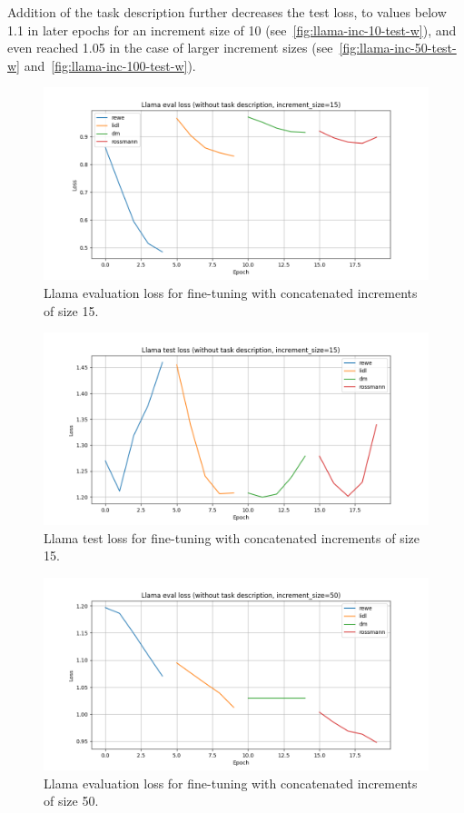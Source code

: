 \documentclass[licencjacka,en]{pracamgr}
\begin{document}
Addition of the task description further decreases the test loss, to values below 1.1 in later epochs for an increment size of 10 (see~\ref{fig:llama-inc-10-test-w}), and even reached 1.05 in the case of larger increment sizes (see~\ref{fig:llama-inc-50-test-w} and~\ref{fig:llama-inc-100-test-w}).

\begin{figure}[htbp]
    \centering
    \includegraphics[width=0.8\linewidth]{bachelor_images/llama_ft/llama-inc-15-tot-eval.png}
    \caption{Llama evaluation loss for fine-tuning with concatenated increments of size 15.}
    \label{fig:llama-inc-tot-15-eval}
\end{figure}

\begin{figure}[htbp]
    \centering
    \includegraphics[width=0.8\linewidth]{bachelor_images/llama_ft/llama-inc-15-tot-test.png}
    \caption{Llama test loss for fine-tuning with concatenated increments of size 15.}
    \label{fig:llama-inc-tot-15-test}
\end{figure}

\begin{figure}[htbp]
    \centering
    \includegraphics[width=0.8\linewidth]{bachelor_images/llama_ft/llama-inc-50-tot-eval.png}
    \caption{Llama evaluation loss for fine-tuning with concatenated increments of size 50.}
    \label{fig:llama-inc-tot-50-eval}
\end{figure}
\end{document}
